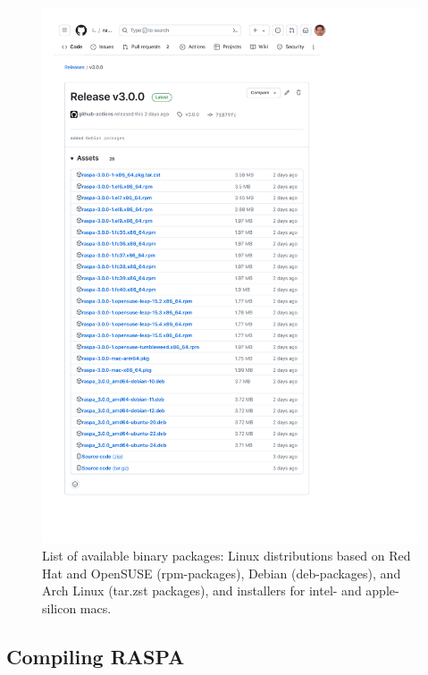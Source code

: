 \begin{figure}[p]
 \centering
  \includegraphics[width=0.85\linewidth]{introduction/figure_binary_packages.pdf}
  \caption{List of available binary packages: Linux distributions based on Red Hat and OpenSUSE (rpm-packages), Debian (deb-packages), and Arch Linux (tar.zst packages), and installers for intel- and apple-silicon macs.}
  \label{fig: binary_packages}
\end{figure}

\subsection{Compiling RASPA}

